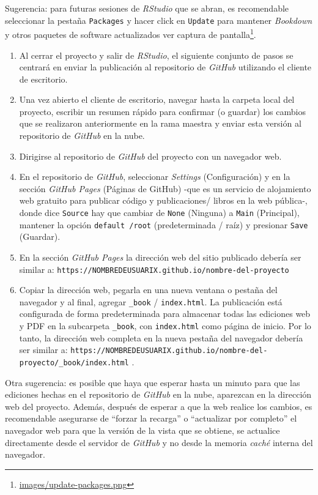 \documentclass[
]{krantz}
\DeclareRobustCommand{\href}[2]{#2\footnote{\url{#1}}}
\begin{document}
Sugerencia: para futuras sesiones de \emph{RStudio} que se abran, es recomendable seleccionar la pestaña \texttt{Packages} y hacer click en \texttt{Update} para mantener \emph{Bookdown} y otros paquetes de software actualizados
\href{images/update-packages.png}{ver captura de pantalla}.

\begin{enumerate}
\def\labelenumi{\arabic{enumi}.}
\setcounter{enumi}{8}
\item
  Al cerrar el proyecto y salir de \emph{RStudio}, el siguiente conjunto de pasos se centrará en enviar la publicación al repositorio de \emph{GitHub} utilizando el cliente de escritorio.
\item
  Una vez abierto el cliente de escritorio, navegar hasta la carpeta local del proyecto, escribir un resumen rápido para confirmar (o guardar) los cambios que se realizaron anteriormente en la rama maestra y enviar esta versión al repositorio de \emph{GitHub} en la nube.
\item
  Dirigirse al repositorio de \emph{GitHub} del proyecto con un navegador web.
\item
  En el repositorio de \emph{GitHub}, seleccionar \emph{Settings} (Configuración) y en la sección \emph{GitHub Pages} (Páginas de GitHub) -que es un servicio de alojamiento web gratuito para publicar código y publicaciones/ libros en la web pública-, donde dice \texttt{Source} hay que cambiar de \texttt{None} (Ninguna) a \texttt{Main} (Principal), mantener la opción \texttt{default\ /root} (predeterminada / raíz) y presionar \texttt{Save} (Guardar).
\item
  En la sección \emph{GitHub Pages} la dirección web del sitio publicado debería ser similar a: \texttt{https://NOMBREDEUSUARIX.github.io/nombre-del-proyecto}
\item
  Copiar la dirección web, pegarla en una nueva ventana o pestaña del navegador y al final, agregar \texttt{\_book} / \texttt{index.html}. La publicación está configurada de forma predeterminada para almacenar todas las ediciones web y PDF en la subcarpeta \texttt{\_book}, con \texttt{index.html} como página de inicio. Por lo tanto, la dirección web completa en la nueva pestaña del navegador debería ser similar a: \texttt{https://NOMBREDEUSUARIX.github.io/nombre-del-proyecto/\_book/index.html} .
\end{enumerate}

Otra sugerencia: es posible que haya que esperar hasta un minuto para que las ediciones hechas en el repositorio de \emph{GitHub} en la nube, aparezcan en la dirección web del proyecto. Además, después de esperar a que la web realice los cambios, es recomendable asegurarse de ``forzar la recarga'' o ``actualizar por completo'' el navegador web para que la versión de la vista que se obtiene, se actualice directamente desde el servidor de \emph{GitHub} y no desde la memoria \emph{caché} interna del navegador.
\end{document}
